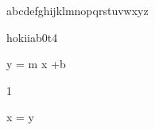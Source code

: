 \documentclass{article}
\renewenvironment{equation}%
  {\endgraf\noindent%
    \endgraf\verbatim}%
   {\endverbatim}
\begin{document}
abcdefghijklmnopqrstuvwxyz

hokiiab0t4

\begin{equation}
y = m x +b
\end{equation}

1

\begin{equation}
x = y
\end{equation}
\end{document}
